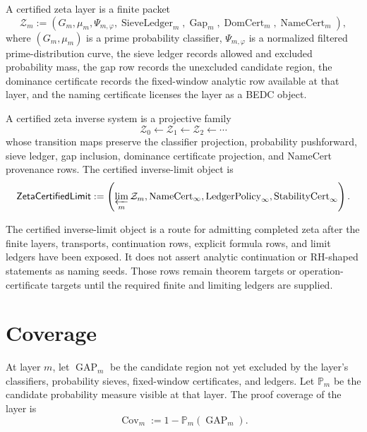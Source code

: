 \begin{definition}
\label{def:rh-certified-zeta-layer}
A certified zeta layer is a finite packet
$$
\mathcal Z_m
:=
\left(
G_m,\mu_m,\Psi_{m,\varphi},
\operatorname{SieveLedger}_m,
\operatorname{Gap}_m,
\operatorname{DomCert}_m,
\operatorname{NameCert}_m
\right),
$$
where $(G_m,\mu_m)$ is a prime probability classifier, $\Psi_{m,\varphi}$
is a normalized filtered prime-distribution curve, the sieve ledger
records allowed and excluded probability mass, the gap row records the
unexcluded candidate region, the dominance certificate records the
fixed-window analytic row available at that layer, and the naming
certificate licenses the layer as a BEDC object.
\end{definition}

\begin{definition}
\label{def:rh-certified-zeta-inverse-system}
A certified zeta inverse system is a projective family
$$
\mathcal Z_0
\leftarrow
\mathcal Z_1
\leftarrow
\mathcal Z_2
\leftarrow\cdots
$$
whose transition maps preserve the classifier projection, probability
pushforward, sieve ledger, gap inclusion, dominance certificate
projection, and NameCert provenance rows.  The certified inverse-limit
object is
$$
\mathsf{ZetaCertifiedLimit}
:=
\left(
\varprojlim_m\mathcal Z_m,
\operatorname{NameCert}_\infty,
\operatorname{LedgerPolicy}_\infty,
\operatorname{StabilityCert}_\infty
\right).
$$
\end{definition}

\begin{principle}
\label{prin:rh-zeta-not-seed-assertion}
The certified inverse-limit object is a route for admitting completed
zeta after the finite layers, transports, continuation rows, explicit
formula rows, and limit ledgers have been exposed.  It does not assert
analytic continuation or RH-shaped statements as naming seeds.  Those
rows remain theorem targets or operation-certificate targets until the
required finite and limiting ledgers are supplied.
\end{principle}

\section{Coverage}
\label{sec:rh-zeta-certified-inverse-limit-coverage}

\begin{definition}
\label{def:rh-candidate-gap-coverage}
At layer $m$, let $\operatorname{GAP}_m$ be the candidate region not yet
excluded by the layer's classifiers, probability sieves, fixed-window
certificates, and ledgers.  Let $\mathbb P_m$ be the candidate
probability measure visible at that layer.  The proof coverage of the
layer is
$$
\operatorname{Cov}_m
:=
1-\mathbb P_m(\operatorname{GAP}_m).
$$
\end{definition}


